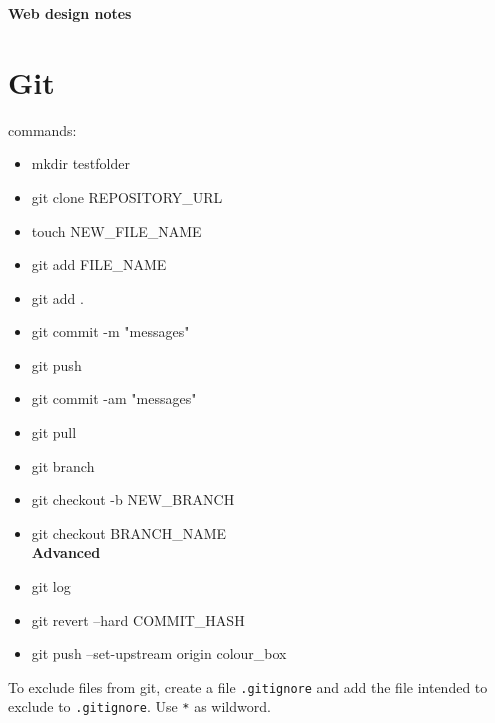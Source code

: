 \documentclass[a4paper]{article}
\begin{document}
\color{Btext}
\begin{center}
	\LARGE\bfseries
	Web design notes
\end{center}
\section{Git}
\ttfamily
commands:
\begin{itemize}
		\item mkdir testfolder
		\item git clone REPOSITORY\_URL
		\item touch NEW\_FILE\_NAME
		\item git add FILE\_NAME
		\item git add . 
		\item git commit -m "messages"
		\item git push
		\item git commit -am "messages"
		\item git pull
		\item git branch
		\item git checkout -b NEW\_BRANCH
		\item git checkout BRANCH\_NAME\\
	
		\color{CBlue}
		\textbf{Advanced}
		\item git log
		\item git revert --hard COMMIT\_HASH
		\item git push --set-upstream origin colour\_box
\end{itemize}
\normalfont
To exclude files from git, create a file \texttt{.gitignore} and add the file intended to exclude to \texttt{.gitignore}. Use \texttt{*} as wildword. 

\end{document}
